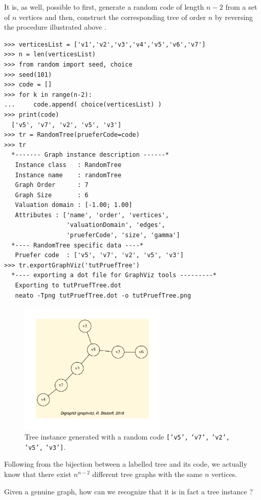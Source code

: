 It is, as well, possible to first, generate a random \Pruefer code of length $n-2$ from a set of $n$ vertices and then, construct the corresponding tree of order $n$ by reversing the procedure illustrated above \citep{JPB-1991}.
\begin{lstlisting}[caption={Generating a tree graph with a random \Pruefer code.},label=list:22.2]
>>> verticesList = ['v1','v2','v3','v4','v5','v6','v7']
>>> n = len(verticesList)
>>> from random import seed, choice
>>> seed(101)
>>> code = []
>>> for k in range(n-2):
...     code.append( choice(verticesList) )
>>> print(code)
  ['v5', 'v7', 'v2', 'v5', 'v3']
>>> tr = RandomTree(prueferCode=code)
>>> tr
  *------- Graph instance description ------*
   Instance class   : RandomTree
   Instance name    : randomTree
   Graph Order      : 7
   Graph Size       : 6
   Valuation domain : [-1.00; 1.00]
   Attributes : ['name', 'order', 'vertices',
                 'valuationDomain', 'edges',
                 'prueferCode', 'size', 'gamma']
  *---- RandomTree specific data ----*
   Pruefer code  : ['v5', 'v7', 'v2', 'v5', 'v3']
>>> tr.exportGraphViz('tutPruefTree')
  *---- exporting a dot file for GraphViz tools ---------*
   Exporting to tutPruefTree.dot
   neato -Tpng tutPruefTree.dot -o tutPruefTree.png
\end{lstlisting}
\begin{figure}[h]
\sidecaption
\includegraphics[width=7cm]{Figures/tutPruefTree.pdf}
\caption{Tree instance generated with a random \Pruefer code \texttt{['v5',} \texttt{'v7',} \texttt{'v2',} \texttt{'v5',} \texttt{'v3']}.} 
\label{fig:22.2}       %
\end{figure}

Following from the bijection between a labelled tree and its \Pruefer code, we actually know that there exist $n^{n-2}$ different tree graphs with the same $n$ vertices.

Given a genuine graph, how can we recognize that it is in fact a tree instance ?

